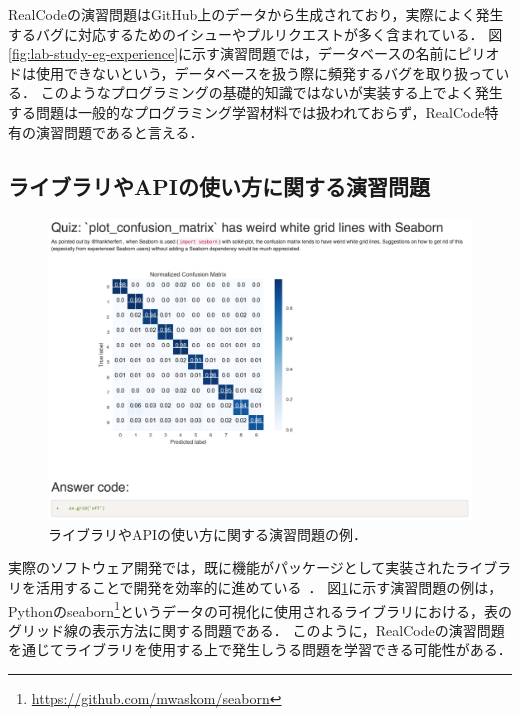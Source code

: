 RealCodeの演習問題はGitHub上のデータから生成されており，実際によく発生するバグに対応するためのイシューやプルリクエストが多く含まれている．
図\ref{fig:lab-study-eg-experience}に示す演習問題では，データベースの名前にピリオドは使用できないという，データベースを扱う際に頻発するバグを取り扱っている．
このようなプログラミングの基礎的知識ではないが実装する上でよく発生する問題は一般的なプログラミング学習材料では扱われておらず，RealCode特有の演習問題であると言える．


\subsection{ライブラリやAPIの使い方に関する演習問題}

\begin{figure}[t]
	\centering
  \includegraphics[width=1.0\columnwidth]{20190107-lab-study-lib-exercise.png}
  \caption{ライブラリやAPIの使い方に関する演習問題の例．}
  \label{fig:lab-study-eg-lib}
\end{figure}

実際のソフトウェア開発では，既に機能がパッケージとして実装されたライブラリを活用することで開発を効率的に進めている~\cite{Leveraging_API}．
図\ref{fig:lab-study-eg-lib}に示す演習問題の例は，Pythonのseaborn\footnote{\url{https://github.com/mwaskom/seaborn}}というデータの可視化に使用されるライブラリにおける，表のグリッド線の表示方法に関する問題である．
このように，RealCodeの演習問題を通じてライブラリを使用する上で発生しうる問題を学習できる可能性がある．
